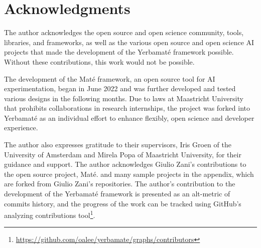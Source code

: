 

\section{Acknowledgments}

The author acknowledges the open source and open science community, tools, libraries, and frameworks, as well as the various open source and open science AI projects that made the development of the Yerbamaté framework possible. Without these contributions, this work would not be possible.

The development of the Maté framework, an open source tool for AI experimentation, began in June 2022
 and was further developed and tested various designs in the following months. Due to laws at Maastricht University that prohibits collaborations in research internships, the project was forked into Yerbamaté as an individual effort to enhance flexibly, open science and developer experience. 

The author also expresses gratitude to their supervisors, Iris Groen of the University of Amsterdam and Mirela Popa of Maastricht University, for their guidance and support. 
The author acknowledges Giulio Zani's contributions to the open source project, Maté. and many sample projects in the appendix, which are forked from Giulio Zani's repositories. The author's contribution to the development of the Yerbamaté framework is presented as an alt-metric of commits history, and the progress of the work can be tracked using GitHub's analyzing contributions tool\footnote{\url{https://github.com/oalee/yerbamate/graphs/contributors}}.


